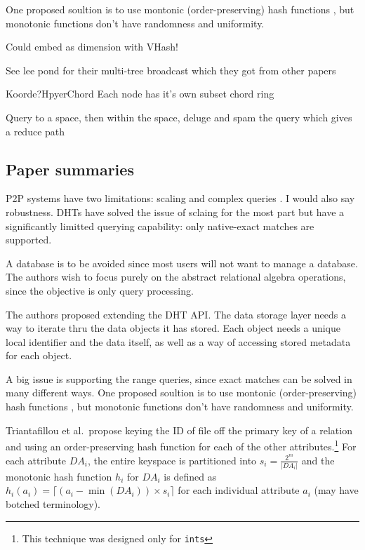 \documentclass[10pt,letterpaper,twoside]{report}
\begin{document}
One proposed soultion is to use montonic (order-preserving) hash functions \cite{triantafillou2004towards}, but monotonic functions don't have randomness and uniformity.


Could embed as dimension with VHash!


See lee pond for their multi-tree broadcast which they got from other papers \cite{lee2012pond}



Koorde?HpyerChord
Each node has it's own subset chord ring

Query to a space, then within the space, deluge and spam the query which gives a reduce path
\subsection{Paper summaries}

P2P systems have two limitations: scaling and complex queries \cite{harren2002complex}.  
I would also say robustness.
DHTs have solved the issue of sclaing for the most part but have a significantly limitted querying capability:  only native-exact matches are supported.  

A database is to be avoided since most users will not want to manage a database.  
The authors wish to focus purely on the abstract relational algebra operations, since the objective is only query processing.

The authors proposed extending the DHT API.
The data storage layer needs a way to iterate thru the data objects it has stored.
Each object needs a unique local identifier and the data itself, as well as a way of accessing stored metadata for each object. 


A big issue is supporting the range queries, since exact matches can be solved in many different ways.
One proposed soultion is to use montonic (order-preserving) hash functions \cite{triantafillou2004towards}, but monotonic functions don't have randomness and uniformity.

Triantafillou et al.\ propose keying the ID of file off the primary key of a relation and using an order-preserving hash function for each of the other attributes.\footnote{This technique was designed only for \texttt{ints}}
For each attribute $DA_i$, the entire keyspace is partitioned into $s_i = \frac{2^{m}}{|DA_{i}|}$ and the monotonic hash function $h_i$ for $DA_i$ is defined as  $h_{i}(a_{i})=\lceil (a_{i} - \min(DA_i)) \times s_i \rceil$ for each individual attribute $a_i$  (may have botched terminology).
\end{document}
